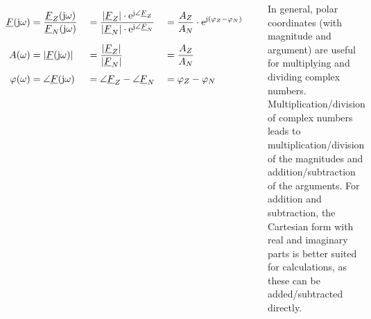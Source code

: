 \begin{frame}[t]
\begin{columns}[T]
{        \begin{align}
            \label{eq:def:F:bruch}
            \underline{F}(\mathrm{j}\omega) 
                            & = \frac{\underline{F}_Z(\mathrm{j}\omega)}{\underline{F}_N(\mathrm{j}\omega)}&
                            & = \frac{|\underline{F}_Z| \cdot \mathrm{e}^{\mathrm{j}\angle{\underline{F}_Z}}}{|\underline{F}_N| \cdot \mathrm{e}^{\mathrm{j}\angle{\underline{F}_N}}}&
                            & = \frac{A_Z}{A_N} \cdot \mathrm{e}^{\mathrm{j} (\varphi_Z - \varphi_N)}
                            \vphantom{\Bigg|}\\
            \label{eq:def:A:bruch}
            A(\omega)       & = |\underline{F}(\mathrm{j}\omega)|&
                            & = \frac{|\underline{F}_Z|}{|\underline{F}_N|}&
                            & = \frac{A_Z}{A_N}&
                            \vphantom{\Bigg|}\\
            \label{eq:def:phi:bruch}
            \varphi(\omega) & = \angle \underline{F}(\mathrm{j}\omega)&
                            & = \angle{\underline{F}_Z} - \angle{\underline{F}_N}&
                            & = \varphi_Z - \varphi_N
        \end{align}

        In general, polar coordinates (with magnitude and argument) are useful for multiplying and dividing complex numbers.
        Multiplication/division of complex numbers leads to multiplication/division of the magnitudes and addition/subtraction of the arguments.
        For addition and subtraction, the Cartesian form with real and imaginary parts is better suited for calculations, 
        as these can be added/subtracted directly.
    }
\end{columns}
\end{frame}


